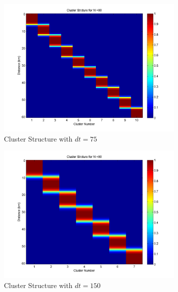 \begin{figure}[H]
\centering
\begin{subfigure}[b]{0.4\textwidth}
\centering
\includegraphics[width=\textwidth]{figures_2/fig_cluster_162_60_75}
\caption{Cluster Structure with $dt = 75$}
\label{clust_dt_75}
\end{subfigure}
\begin{subfigure}[b]{0.4\textwidth}
\centering
\includegraphics[width=\textwidth]{figures_2/fig_cluster_162_60_150}
\caption{Cluster Structure with $dt = 150$}
\label{clust_dt_150}
\end{subfigure}  \\
\begin{subfigure}[b]{0.4\textwidth}

\end{subfigure}
\end{figure}

